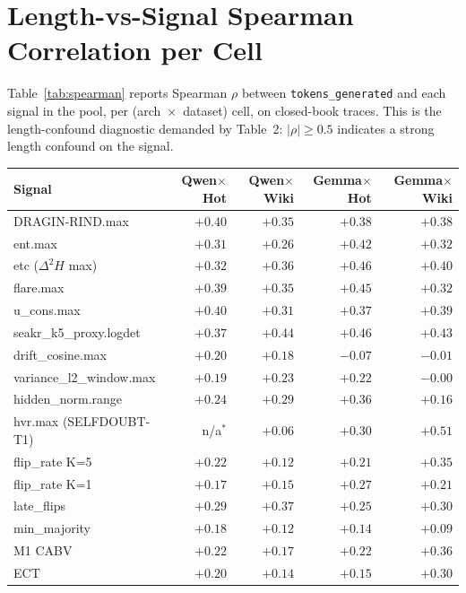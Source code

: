 \documentclass[11pt]{article}
\begin{document}
\section{Length-vs-Signal Spearman Correlation per Cell}
\label{sec:appendix-spearman}

Table~\ref{tab:spearman} reports Spearman $\rho$ between
\texttt{tokens\_generated} and each signal in the pool, per
(arch~$\times$~dataset) cell, on closed-book traces. This is the
length-confound diagnostic demanded by
\cite{Santilli_RevisitingUQEvaluationLengthBias} Table~2:
$|\rho| \geq 0.5$ indicates a strong length confound on the signal.

\begin{table}[h]
\centering\small
\begin{tabular}{@{}lrrrr@{}}
\toprule
\textbf{Signal} & \textbf{Qwen$\times$Hot} & \textbf{Qwen$\times$Wiki} &
\textbf{Gemma$\times$Hot} & \textbf{Gemma$\times$Wiki} \\
\midrule
DRAGIN-RIND.max       & $+0.40$ & $+0.35$ & $+0.38$ & $+0.38$ \\
ent.max               & $+0.31$ & $+0.26$ & $+0.42$ & $+0.32$ \\
etc ($\Delta^2 H$ max)& $+0.32$ & $+0.36$ & $+0.46$ & $+0.40$ \\
flare.max             & $+0.39$ & $+0.35$ & $+0.45$ & $+0.32$ \\
u\_cons.max           & $+0.40$ & $+0.31$ & $+0.37$ & $+0.39$ \\
seakr\_k5\_proxy.logdet & $+0.37$ & $+0.44$ & $+0.46$ & $+0.43$ \\
drift\_cosine.max     & $+0.20$ & $+0.18$ & $-0.07$ & $-0.01$ \\
variance\_l2\_window.max & $+0.19$ & $+0.23$ & $+0.22$ & $-0.00$ \\
hidden\_norm.range    & $+0.24$ & $+0.29$ & $+0.36$ & $+0.16$ \\
hvr.max (SELFDOUBT-T1)& n/a$^{*}$ & $+0.06$ & $+0.30$ & $\mathbf{+0.51}$ \\
\midrule
flip\_rate K=5    & $+0.22$ & $+0.12$ & $+0.21$ & $+0.35$ \\
flip\_rate K=1    & $+0.17$ & $+0.15$ & $+0.27$ & $+0.21$ \\
late\_flips       & $+0.29$ & $+0.37$ & $+0.25$ & $+0.30$ \\
min\_majority     & $+0.18$ & $+0.12$ & $+0.14$ & $+0.09$ \\
M1 CABV               & $+0.22$ & $+0.17$ & $+0.22$ & $+0.36$ \\
ECT                & $+0.20$ & $+0.14$ & $+0.15$ & $+0.30$ \\

\end{tabular}
\end{table}
\end{document}
